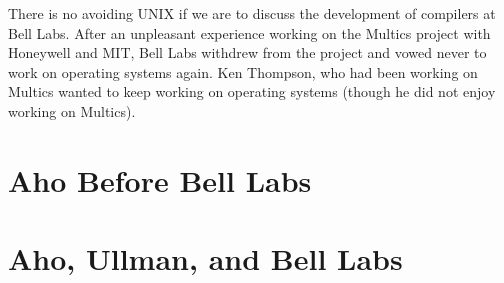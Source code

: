 There is no avoiding UNIX if we are to discuss the development of compilers at Bell Labs.
After an unpleasant experience working on the Multics project with Honeywell and MIT,
Bell Labs withdrew from the project and vowed never to work on operating systems again.
Ken Thompson, who had been working on Multics wanted to keep working on operating systems
(though he did not enjoy working on Multics).


\section{Aho Before Bell Labs}

\section{Aho, Ullman, and Bell Labs}

